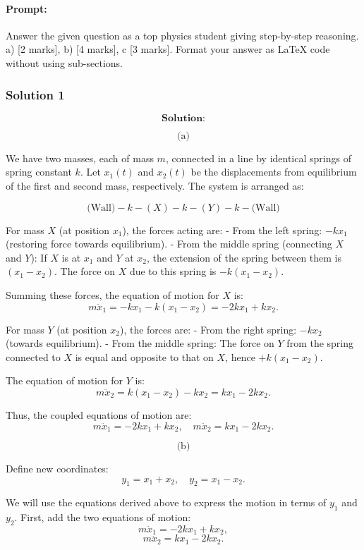 \documentclass{article}
\begin{document}
\paragraph{Prompt: \\} 
Answer the given question as a top physics student giving step-by-step reasoning. a) [2 marks], b) [4 marks], c [3 marks].
Format your answer as LaTeX code without using sub-sections. 

\subsubsection{Solution 1}
\[
\textbf{Solution:}
\]

\[
\text{(a)}
\]

We have two masses, each of mass $m$, connected in a line by identical springs of spring constant $k$. Let $x_1(t)$ and $x_2(t)$ be the displacements from equilibrium of the first and second mass, respectively. The system is arranged as:

\[
\text{(Wall)} - k - (X) - k - (Y) - k - \text{(Wall)}
\]

For mass $X$ (at position $x_1$), the forces acting are:
- From the left spring: $-k x_1$ (restoring force towards equilibrium).
- From the middle spring (connecting $X$ and $Y$): If $X$ is at $x_1$ and $Y$ at $x_2$, the extension of the spring between them is $(x_1 - x_2)$. The force on $X$ due to this spring is $-k(x_1 - x_2)$.

Summing these forces, the equation of motion for $X$ is:
\[
m\ddot{x}_1 = -k x_1 - k(x_1 - x_2) = -2k x_1 + k x_2.
\]

For mass $Y$ (at position $x_2$), the forces are:
- From the right spring: $-k x_2$ (towards equilibrium).
- From the middle spring: The force on $Y$ from the spring connected to $X$ is equal and opposite to that on $X$, hence $+k(x_1 - x_2)$.

The equation of motion for $Y$ is:
\[
m\ddot{x}_2 = k(x_1 - x_2) - k x_2 = kx_1 - 2k x_2.
\]

Thus, the coupled equations of motion are:
\[
m\ddot{x}_1 = -2k x_1 + k x_2, \quad m\ddot{x}_2 = k x_1 - 2k x_2.
\]

\[
\text{(b)}
\]

Define new coordinates:
\[
y_1 = x_1 + x_2, \quad y_2 = x_1 - x_2.
\]

We will use the equations derived above to express the motion in terms of $y_1$ and $y_2$. First, add the two equations of motion:
\[
m\ddot{x}_1 = -2k x_1 + k x_2,
\]
\[
m\ddot{x}_2 = k x_1 - 2k x_2.
\]
\end{document}
